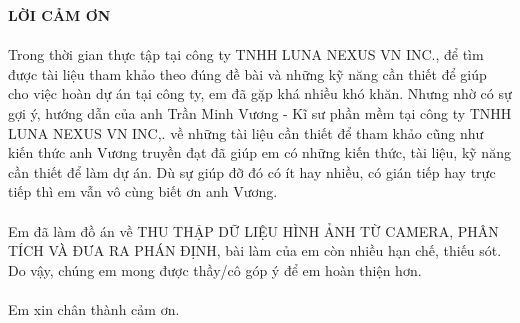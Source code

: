 	\pagestyle{fancy}
	\fancyhf{}
	\chead{\thepage}
	\renewcommand{\headrulewidth}{0pt}
	\begin{center}
		\setcounter{page}{1}
		\fontsize{16}{20}\selectfont
		\textbf{LỜI CẢM ƠN\\} 
	\end{center}
	\fontsize{13}{13}\selectfont
	\paragraph{}
	Trong thời gian thực tập tại công ty TNHH LUNA NEXUS VN INC., để tìm được tài liệu tham khảo theo đúng đề bài và những kỹ năng cần thiết để giúp cho việc hoàn dự án tại công ty, em đã gặp khá nhiều khó khăn. Nhưng nhờ có sự gợi ý, hướng dẫn của anh Trần Minh Vương - Kĩ sư phần mềm tại công ty TNHH LUNA NEXUS VN INC,. về những tài liệu cần thiết để tham khảo cũng như kiến thức anh Vương truyền đạt đã giúp em có những kiến thức, tài liệu, kỹ năng cần thiết để làm dự án. Dù sự giúp đỡ đó có ít hay nhiều, có gián tiếp hay trực tiếp thì em vẫn vô cùng biết ơn anh Vương.
    \paragraph{}
	Em đã làm đồ án về THU THẬP DỮ LIỆU HÌNH ẢNH TỪ CAMERA, PHÂN TÍCH VÀ ĐƯA RA PHÁN ĐỊNH, bài làm của em còn nhiều hạn chế, thiếu sót. Do vậy, chúng em mong được thầy/cô góp ý để em hoàn thiện hơn.
	\paragraph{}
	Em xin chân thành cảm ơn.
	\pagebreak	
